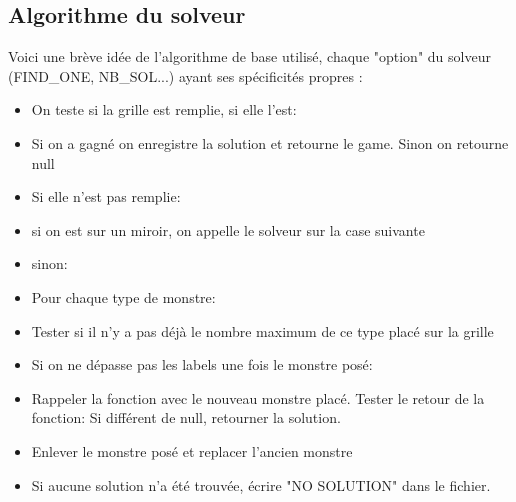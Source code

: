 \documentclass[12pt]{article}
\begin{document}
\subsection{Algorithme du solveur}
Voici une brève idée de l'algorithme de base utilisé, chaque "option" du solveur
(FIND\_ONE, NB\_SOL...) ayant ses spécificités propres :
 
\vspace{5mm}
\begin{itemize}[label=$\square$,leftmargin=0cm ,parsep=0cm,itemsep=0cm,topsep=0cm]
\item On teste si la grille est remplie, si elle l'est:
\end{itemize}
\begin{itemize}[label=$\square$,leftmargin=1cm ,parsep=0cm,itemsep=0cm,topsep=0cm]
\item Si on a gagné on enregistre la solution et retourne le game. Sinon on retourne null
\end{itemize}
\begin{itemize}[label=$\square$,leftmargin=0cm ,parsep=0cm,itemsep=0cm,topsep=0cm]
\item Si elle n'est pas remplie:
\end{itemize}
\begin{itemize}[label=$\square$,leftmargin=1cm ,parsep=0cm,itemsep=0cm,topsep=0cm]
\item si on est sur un miroir, on appelle le solveur sur la case suivante
\item sinon:
\end{itemize}
\begin{itemize}[label=$\square$,leftmargin=2cm ,parsep=0cm,itemsep=0cm,topsep=0cm]
\item Pour chaque type de monstre:
\end{itemize}
\begin{itemize}[label=$\square$,leftmargin=3cm ,parsep=0cm,itemsep=0cm,topsep=0cm]
\item Tester si il n'y a pas déjà le nombre maximum de ce type placé sur la grille
\item Si on ne dépasse pas les labels une fois le monstre posé:
\end{itemize}
\begin{itemize}[label=$\square$,leftmargin=4cm ,parsep=0cm,itemsep=0cm,topsep=0cm]
\item Rappeler la fonction avec le nouveau monstre placé. Tester le retour de la fonction: Si différent de null, retourner la solution.
\end{itemize}
\begin{itemize}[label=$\square$,leftmargin=3cm ,parsep=0cm,itemsep=0cm,topsep=0cm]
\item Enlever le monstre posé et replacer l'ancien monstre
\end{itemize}
\begin{itemize}[label=$\square$,leftmargin=2cm ,parsep=0cm,itemsep=0cm,topsep=0cm]
\item Si aucune solution n'a été trouvée, écrire "NO SOLUTION" dans le fichier.
\end{itemize}
\end{document}
